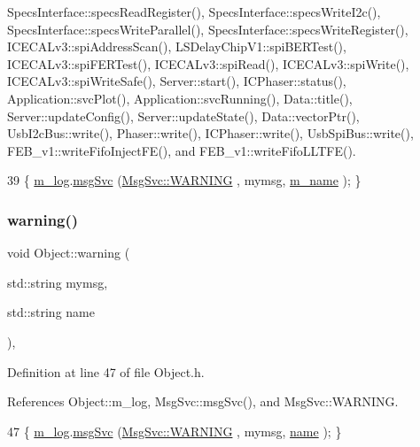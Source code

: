 Specs\+Interface\+::specs\+Read\+Register(), Specs\+Interface\+::specs\+Write\+I2c(), Specs\+Interface\+::specs\+Write\+Parallel(), Specs\+Interface\+::specs\+Write\+Register(), I\+C\+E\+C\+A\+Lv3\+::spi\+Address\+Scan(), L\+S\+Delay\+Chip\+V1\+::spi\+B\+E\+R\+Test(), I\+C\+E\+C\+A\+Lv3\+::spi\+F\+E\+R\+Test(), I\+C\+E\+C\+A\+Lv3\+::spi\+Read(), I\+C\+E\+C\+A\+Lv3\+::spi\+Write(), I\+C\+E\+C\+A\+Lv3\+::spi\+Write\+Safe(), Server\+::start(), I\+C\+Phaser\+::status(), Application\+::svc\+Plot(), Application\+::svc\+Running(), Data\+::title(), Server\+::update\+Config(), Server\+::update\+State(), Data\+::vector\+Ptr(), Usb\+I2c\+Bus\+::write(), Phaser\+::write(), I\+C\+Phaser\+::write(), Usb\+Spi\+Bus\+::write(), F\+E\+B\+\_\+v1\+::write\+Fifo\+Inject\+F\+E(), and F\+E\+B\+\_\+v1\+::write\+Fifo\+L\+L\+T\+F\+E().


\begin{DoxyCode}
39 \{ \hyperlink{classObject_a0d269813dd7ac1f24bc143031e2963f2}{m\_log}.\hyperlink{classMsgSvc_ad25f18047920cc59a314e5098259711c}{msgSvc} (\hyperlink{classMsgSvc_ae671eb7301996cd049d2da8a65925926a7cefae88f2ba26b2b05b676a383c834b}{MsgSvc::WARNING} , mymsg, \hyperlink{classObject_a8b83c95c705d2c3ba0d081fe1710f48d}{m\_name} ); \}
\end{DoxyCode}
\mbox{\label{classObject_a11f101db4dd73d9391b0231818881d86}} 
\subsubsection{\texorpdfstring{warning()}{warning()}\hspace{0.1cm}{\footnotesize\ttfamily [2/2]}}
{\footnotesize\ttfamily void Object\+::warning (\begin{DoxyParamCaption}\item[{std\+::string}]{mymsg,  }\item[{std\+::string}]{name }\end{DoxyParamCaption})\hspace{0.3cm}{\ttfamily [inline]}, {\ttfamily [inherited]}}



Definition at line 47 of file Object.\+h.



References Object\+::m\+\_\+log, Msg\+Svc\+::msg\+Svc(), and Msg\+Svc\+::\+W\+A\+R\+N\+I\+NG.


\begin{DoxyCode}
47 \{ \hyperlink{classObject_a0d269813dd7ac1f24bc143031e2963f2}{m\_log}.\hyperlink{classMsgSvc_ad25f18047920cc59a314e5098259711c}{msgSvc} (\hyperlink{classMsgSvc_ae671eb7301996cd049d2da8a65925926a7cefae88f2ba26b2b05b676a383c834b}{MsgSvc::WARNING} , mymsg, \hyperlink{classObject_a300f4c05dd468c7bb8b3c968868443c1}{name} ); \}
\end{DoxyCode}


